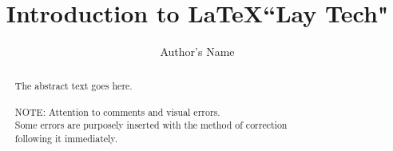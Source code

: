 \documentclass{article}
\title{Introduction to \LaTeX{\textquotedblleft Lay Tech"}}		%
\author{Author's Name}
\begin{document}
\maketitle


\hfill 
\hfill \\
\hfill \\
\hfill \\
\hfill \\
\hfill \\
\hfill \\
\hfill \\
\hfill \\
\hfill \\
\hfill \\
\hfill \\
\hfill \\
\hfill \\
\hfill \\
\hfill \\
\hfill \\
\hfill \\
\hfill \\
\hfill \\
\hfill \\
\hfill



\begin{abstract}
\noindent The abstract text goes here.\\
\hfill \\
NOTE: Attention to comments and visual errors.\\
\qquad \quad Some errors are purposely inserted with the method of correction \\
\indent \qquad following it immediately.
\end{abstract}
\end{document}
